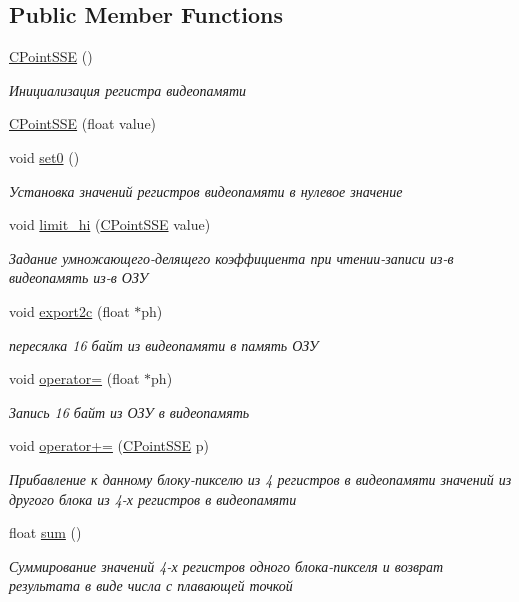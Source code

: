 \subsection*{Public Member Functions}
\begin{DoxyCompactItemize}
\item 
\hyperlink{class_c_point_s_s_e_ade2da0d5d55a42f93b516b351da78bcc}{C\+Point\+S\+S\+E} ()
\begin{DoxyCompactList}\small\item\em Инициализация регистра видеопамяти \end{DoxyCompactList}\item 
\hyperlink{class_c_point_s_s_e_abd611f212d90b86e7d64e35ed0028b23}{C\+Point\+S\+S\+E} (float value)
\item 
void \hyperlink{class_c_point_s_s_e_a8a516dcceb3bf62c514b98161fbee9e8}{set0} ()
\begin{DoxyCompactList}\small\item\em Установка значений регистров видеопамяти в нулевое значение \end{DoxyCompactList}\item 
void \hyperlink{class_c_point_s_s_e_aaf16570e1b45b827b2daf5cc7a72e1b5}{limit\+\_\+hi} (\hyperlink{class_c_point_s_s_e}{C\+Point\+S\+S\+E} value)
\begin{DoxyCompactList}\small\item\em Задание умножающего-\/делящего коэффициента при чтении-\/записи из-\/в видеопамять из-\/в ОЗУ \end{DoxyCompactList}\item 
void \hyperlink{class_c_point_s_s_e_a350aeb352b3d2bc72ca55be04f1efd09}{export2c} (float $\ast$ph)
\begin{DoxyCompactList}\small\item\em пересялка 16 байт из видеопамяти в память ОЗУ \end{DoxyCompactList}\item 
void \hyperlink{class_c_point_s_s_e_a852d887d77c016dd40e8ab17a2b80c08}{operator=} (float $\ast$ph)
\begin{DoxyCompactList}\small\item\em Запись 16 байт из ОЗУ в видеопамять \end{DoxyCompactList}\item 
void \hyperlink{class_c_point_s_s_e_a6ebb1e404c03632ddf217fae1853c61e}{operator+=} (\hyperlink{class_c_point_s_s_e}{C\+Point\+S\+S\+E} p)
\begin{DoxyCompactList}\small\item\em Прибавление к данному блоку-\/пикселю из 4 регистров в видеопамяти значений из другого блока из 4-\/х регистров в видеопамяти \end{DoxyCompactList}\item 
float \hyperlink{class_c_point_s_s_e_af4363118542095ec40ee22933cbb99d6}{sum} ()
\begin{DoxyCompactList}\small\item\em Суммирование значений 4-\/х регистров одного блока-\/пикселя и возврат результата в виде числа с плавающей точкой \end{DoxyCompactList}\end{DoxyCompactItemize}


